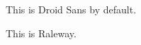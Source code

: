 \documentclass[11pt,letterpaper]{article}
\begin{document}
This is Droid Sans by default.

{ This is Raleway.}
\end{document}
